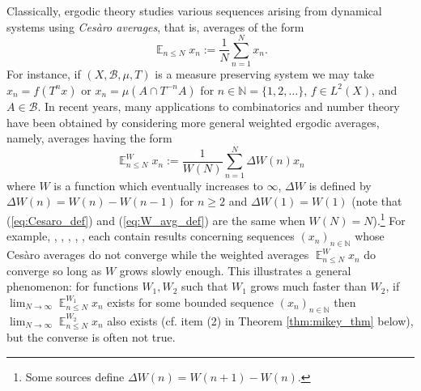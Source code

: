 \documentclass[12pt]{article}
\theoremstyle{plain} %
\theoremstyle{definition} %
\theoremstyle{plain}
\theoremstyle{plain}
\numberwithin{equation}{section}
\newcommand{\Cesaro}{Ces\`{a}ro }
\newcommand{\N}{\mathbb{N}}
\renewcommand{\leq}{\leqslant}
\renewcommand{\geq}{\geqslant}
\newcommand{\1}{\mathbbm{1}}
\newcommand{\E}{\operatorname{\mathbb{E}}}
\newcommand{\oo}{\infty}
\begin{document}
Classically, ergodic theory studies various sequences arising from dynamical systems using \emph{\Cesaro averages}, that is, averages of the form 
\begin{equation}\label{eq:Cesaro_def}
\E_{n\leq N}x_n :=\frac{1}{N}\sum_{n=1}^Nx_n.
\end{equation}
For instance, if $(X,\mathscr{B},\mu,T)$ is a measure preserving system we may take $x_n=f(T^nx)$ or $x_n = \mu(A\cap T^{-n} A)$ for $n\in\N= \{1,2,\dots\}$, $f\in L^{2}(X)$, and $A\in \mathscr{B}$. In recent years, many applications to combinatorics and number theory have been obtained by considering more general weighted ergodic averages, namely, averages having the form
\begin{equation}\label{eq:W_avg_def}
\E_{n\leq N}^Wx_n:=\frac{1}{W(N)}\sum_{n=1}^N\Delta W(n)x_n
\end{equation}
where $W$ is a function which eventually increases to $\oo$, $\Delta W$ is defined by $\Delta W(n) = W(n)-W(n-1)$ for $n\geq 2$ and $\Delta W(1)=W(1)$ (note that (\ref{eq:Cesaro_def}) and (\ref{eq:W_avg_def}) are the same when $W(N)=N$).\footnote{Some sources define $\Delta W(n) = W(n+1)-W(n)$.}
For example, \cite{Bergelson_Moreira_Richter_2020}, \cite{Fran22}, \cite{Richter23}, \cite{BMR24}, \cite{LM25}, \cite{BKS2025} each contain results concerning sequences $(x_n)_{n\in \N}$ whose \Cesaro averages do not converge while the weighted averages $\E_{n\leq N}^Wx_n$ do converge so long as $W$ grows slowly enough. This illustrates a general phenomenon: for functions $W_1, W_2$ such that $W_1$ grows much faster than $W_2$, if $\lim_{N\to\oo}\E_{n\leq N}^{W_1}x_n$ exists for some bounded sequence $(x_n)_{n\in \N}$ then $\lim_{N\to\oo}\E_{n\leq N}^{W_2}x_n$ also exists (cf. item (2) in Theorem \ref{thm:mikey_thm} below), but the converse is often not true.
\end{document}
